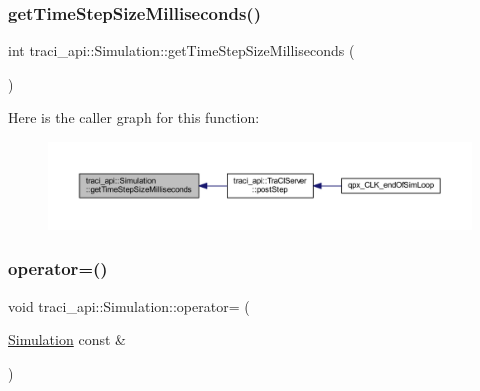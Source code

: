 \subsubsection{\texorpdfstring{get\+Time\+Step\+Size\+Milliseconds()}{getTimeStepSizeMilliseconds()}}
{\footnotesize\ttfamily int traci\+\_\+api\+::\+Simulation\+::get\+Time\+Step\+Size\+Milliseconds (\begin{DoxyParamCaption}{ }\end{DoxyParamCaption})}

Here is the caller graph for this function\+:\nopagebreak
\begin{figure}[H]
\begin{center}
\leavevmode
\includegraphics[width=350pt]{classtraci__api_1_1_simulation_a413eac30f40f25fabbd94cc6ff16a51c_icgraph}
\end{center}
\end{figure}
\mbox{\label{classtraci__api_1_1_simulation_ad51b13fbeca39505efcb2171212ec99d}} 
\subsubsection{\texorpdfstring{operator=()}{operator=()}}
{\footnotesize\ttfamily void traci\+\_\+api\+::\+Simulation\+::operator= (\begin{DoxyParamCaption}\item[{\hyperlink{classtraci__api_1_1_simulation}{Simulation} const \&}]{ }\end{DoxyParamCaption})\hspace{0.3cm}{\ttfamily [delete]}}

\mbox{\label{classtraci__api_1_1_simulation_aa795b446802e3ddb196ebd29a215005e}} 

